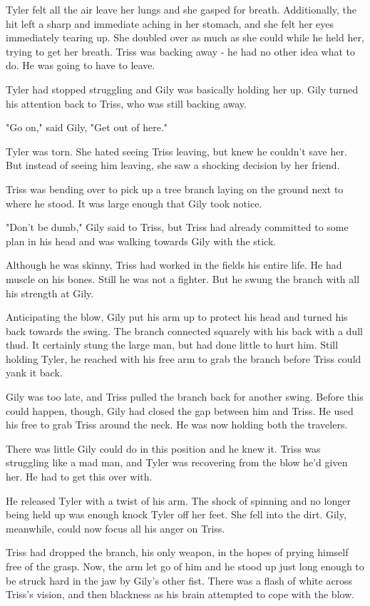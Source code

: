 \documentclass[courier]{sffms}
\begin{document}
Tyler felt all the air leave her lungs and she gasped
for breath. Additionally, the hit left a sharp and
immediate aching in her stomach, and she felt
her eyes immediately tearing up. She doubled over
as much as she could while he held her, trying to get
her breath. Triss was backing away - he had no other
idea what to do. He was going to have to leave.

Tyler had stopped struggling and Gily was basically holding
her up. Gily turned his attention back to Triss, who was still
backing away.

"Go on," said Gily, "Get out of here."

Tyler was torn. She hated seeing Triss leaving, but
knew he couldn't save her. But instead of seeing
him leaving, she saw a shocking decision by
her friend.

Triss was bending over to pick up a tree branch
laying on the ground next to where he stood. It
was large enough that Gily took notice.

"Don't be dumb," Gily said to Triss, but Triss had
already committed to some plan in his head and
was walking towards Gily with the stick.

Although he was skinny, Triss had worked in the
fields his entire life. He had muscle on his bones.
Still he was not a fighter. But he swung the branch
with all his strength at Gily.

Anticipating the blow, Gily put his arm up to protect
his head and turned his back towards the swing.
The branch connected squarely with his back with a
dull thud. It certainly stung the large man, but had
done little to hurt him. Still holding Tyler, he reached
with his free arm to grab the branch before Triss
could yank it back.

Gily was too late, and Triss pulled the branch back
for another swing. Before this could happen, though,
Gily had closed the gap between him and Triss. He
used his free to grab Triss around the neck. He
was now holding both the travelers.

There was little Gily could do in this position and he
knew it. Triss was struggling like a mad man, and 
Tyler was recovering from the blow he'd given her.
He had to get this over with.

He released Tyler with a twist of his arm. The shock
of spinning and no longer being held up was enough
knock Tyler off her feet. She fell into the dirt. Gily,
meanwhile, could now focus all his anger on Triss.

Triss had dropped the branch, his only weapon, in
the hopes of prying himself free of the grasp. Now,
the arm let go of him and he stood up just long
enough to be struck hard in the jaw by Gily's other
fist. There was a flash of white across Triss's vision,
and then blackness as his brain attempted to cope with
the blow.
\end{document}
